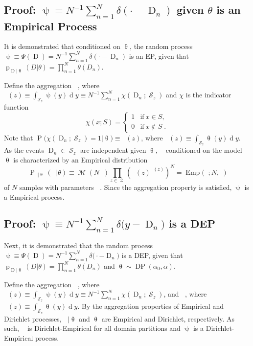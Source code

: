 \documentclass[12pt]{report}
\DeclareMathOperator{\Drm}{\mathrm{D}}
\DeclareMathOperator{\Prm}{\mathrm{P}}
\DeclareMathOperator{\prm}{\mathrm{p}}
\DeclareMathOperator{\drm}{\mathrm{d}}
\DeclareMathOperator{\Zcal}{\mathcal{Z}}
\DeclareMathOperator{\Mcal}{\mathcal{M}}
\DeclareMathOperator{\Scal}{\mathcal{S}}
\DeclareMathOperator{\DP}{\mathrm{DP}}
\DeclareMathOperator{\Emp}{\mathrm{Emp}}
\DeclareMathOperator{\thetam}{\theta_\text{m}}
\DeclareMathOperator{\upthetam}{\uptheta_\text{m}}
\DeclareMathOperator{\psim}{\psi_\text{m}}
\DeclareMathOperator{\uppsim}{\uppsi_\text{m}}
\begin{document}
\subsection{Proof: $\uppsi \equiv N^{-1} \sum_{n=1}^N \delta(\cdot - \Drm_n)$ given $\theta$ is an Empirical Process}

It is demonstrated that conditioned on $\uptheta$, the random process $\uppsi \equiv \Psi(\Drm) = N^{-1} \sum_{n=1}^N \delta(\cdot - \Drm_n)$ is an EP, given that $\prm_{\Drm|\uptheta}(D|\theta) = \prod_{n=1}^N \theta(D_n)$.

Define the aggregation $\uppsim$, where $\uppsim(z) \equiv \int_{\Scal_z} \uppsi(y) {\drm}y \equiv N^{-1} \sum_{n=1}^N \chi(\Drm_n;\Scal_z)$ and $\chi$ is the indicator function
\begin{equation}
\chi(x;S) = \begin{cases} 1 & \mathrm{if} \ x \in S, \\ 0 & \mathrm{if} \ x \notin S \;.  \end{cases}
\end{equation}
Note that $\Prm\big( \chi(\Drm_n;\Scal_z) = 1 \big| \uptheta \big) \equiv \upthetam(z)$, where $\upthetam(z) \equiv \int_{\Scal_z} \uptheta(y) {\drm}y$. As the events $\Drm_n \in \Scal_z$ are independent given $\uptheta$, $\uppsim$ conditioned on the model $\uptheta$ is characterized by an Empirical distribution 
\begin{equation}
\Prm_{\uppsim | \uptheta}(\psim | \theta) \equiv \Mcal(N \psim) \prod_{z \in \Zcal} \left( \thetam(z) ^{\psim(z)} \right)^{N} = \Emp\big( \psim; N,\thetam \big)
\end{equation}
of $N$ samples with parameters $\thetam$. Since the aggregation property is satisfied, $\uppsi$ is a Empirical process.



\subsection{Proof: $\uppsi \equiv N^{-1} \sum_{n=1}^N \delta\big( y-\Drm_n \big)$ is a DEP}

Next, it is demonstrated that the random process $\uppsi \equiv \Psi(\Drm) = N^{-1} \sum_{n=1}^N \delta\big( \cdot-\Drm_n \big)$ is a DEP, given that $\prm_{\Drm|\uptheta}(D|\theta) = \prod_{n=1}^N \theta(D_n)$ and $\uptheta \sim \DP(\alpha_0, \alpha)$. 

Define the aggregation $\uppsim$, where $\uppsim(z) \equiv \int_{\Scal_z} \uppsi(y) {\drm}y \equiv N^{-1} \sum_{n=1}^N \chi(\Drm_n;\Scal_z)$, and $\upthetam$, where $\upthetam(z) \equiv \int_{\Scal_z} \uptheta(y) {\drm}y$. By the aggregation properties of Empirical and Dirichlet processes, $\uppsim | \uptheta$ and $\uptheta$ are Empirical and Dirichlet, respectively. As such, $\uppsim$ is Dirichlet-Empirical for all domain partitions and $\uppsi$ is a Dirichlet-Empirical process.
\end{document}
